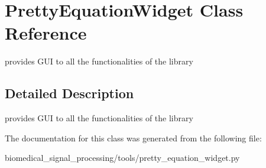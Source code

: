 \hypertarget{classPrettyEquationWidget}{}\section{Pretty\+Equation\+Widget Class Reference}
\label{classPrettyEquationWidget}


provides G\+UI to all the functionalities of the library  




\subsection{Detailed Description}
provides G\+UI to all the functionalities of the library 

The documentation for this class was generated from the following file\+:\begin{DoxyCompactItemize}
\item 
biomedical\+\_\+signal\+\_\+processing/tools/pretty\+\_\+equation\+\_\+widget.\+py\end{DoxyCompactItemize}
